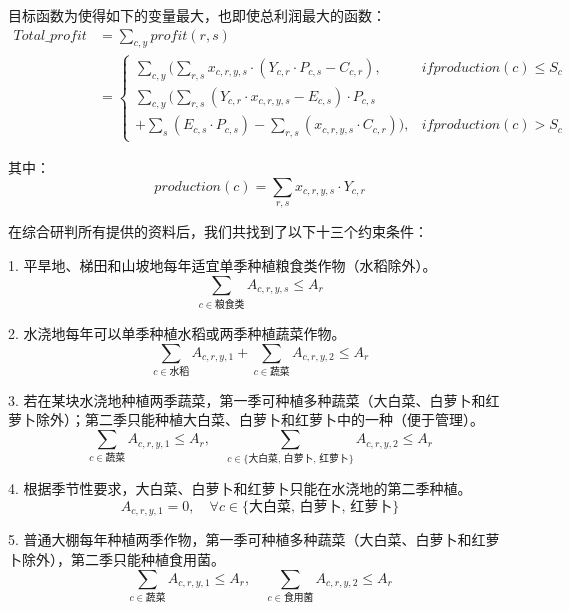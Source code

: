 \documentclass{cumcmthesis}
\begin{document}
目标函数为使得如下的变量最大，也即使总利润最大的函数：\\
\begin{align}
    Total\_profit &= \sum_{c, y} profit(r, s)  \\ 
    &=\begin{cases} 
        \sum_{c, y}(\sum_{r, s} x_{c, r, y, s} \cdot(Y_{c, r} \cdot P_{c, s} - C_{c, r}), 
            & if production(c) \leq S_c \\
        \sum_{c, y}(\sum_{r, s}(Y_{c, r} \cdot x_{c, r, y, s} - E_{c, s}) \cdot P_{c, s} \\
                    + \sum_{s}(E_{c, s} \cdot P_{c, s}) - \sum_{r, s}(x_{c, r, y, s} \cdot C_{c, r})), 
            & if production(c) > S_c
    \end{cases}
\end{align}

其中：
\begin{equation}
    production(c) = \sum_{r, s} x_{c,r,y,s} \cdot Y_{c,r}
\end{equation}

在综合研判所有提供的资料后，我们共找到了以下十三个约束条件：

1. 平旱地、梯田和山坡地每年适宜单季种植粮食类作物（水稻除外）。
   \begin{equation}
   \sum_{c \in \text{粮食类}} A_{c,r,y,s} \leq A_r
   \end{equation}

2. 水浇地每年可以单季种植水稻或两季种植蔬菜作物。
   \begin{equation}
   \sum_{c \in \text{水稻}} A_{c,r,y,1} + \sum_{c \in \text{蔬菜}} A_{c,r,y,2} \leq A_r
   \end{equation}

3. 若在某块水浇地种植两季蔬菜，第一季可种植多种蔬菜（大白菜、白萝卜和红萝卜除外）；第二季只能种植大白菜、白萝卜和红萝卜中的一种（便于管理）。
   \begin{equation}
   \sum_{c \in \text{蔬菜}} A_{c,r,y,1} \leq A_r, \quad \sum_{c \in \{\text{大白菜, 白萝卜, 红萝卜}\}} A_{c,r,y,2} \leq A_r
   \end{equation}

4. 根据季节性要求，大白菜、白萝卜和红萝卜只能在水浇地的第二季种植。
   \begin{equation}
   A_{c,r,y,1} = 0, \quad \forall c \in \{\text{大白菜, 白萝卜, 红萝卜}\}
   \end{equation}

5. 普通大棚每年种植两季作物，第一季可种植多种蔬菜（大白菜、白萝卜和红萝卜除外），第二季只能种植食用菌。
   \begin{equation}
   \sum_{c \in \text{蔬菜}} A_{c,r,y,1} \leq A_r, \quad \sum_{c \in \text{食用菌}} A_{c,r,y,2} \leq A_r
   \end{equation}
\end{document}
